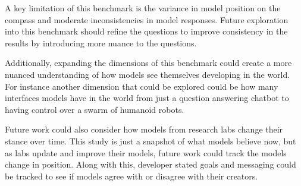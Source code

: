 A key limitation of this benchmark is the variance in model position on the compass and moderate inconsistencies in model responses. Future exploration into this benchmark should refine the questions to improve consistency in the results by introducing more nuance to the questions. 

Additionally, expanding the dimensions of this benchmark could create a more nuanced understanding of how models see themselves developing in the world. For instance another dimension that could be explored could be how many interfaces models have in the world from just a question answering chatbot to having control over a swarm of humanoid robots.

Future work could also consider how models from research labs change their stance over time. This study is just a snapshot of what models believe now, but as labs update and improve their models, future work could track the models change in position. Along with this, developer stated goals and messaging could be tracked to see if models agree with or disagree with their creators.
